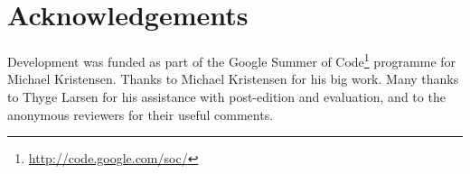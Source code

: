 \documentclass[11pt]{article}
\begin{document}

\section*{Acknowledgements}

Development was funded as part of the Google Summer of Code\footnote{\url{http://code.google.com/soc/}} 
programme for Michael Kristensen. Thanks to Michael Kristensen for his big work.
Many thanks to Thyge Larsen for his assistance with post-edition and evaluation, and to the anonymous
reviewers for their useful comments.



\end{document}
